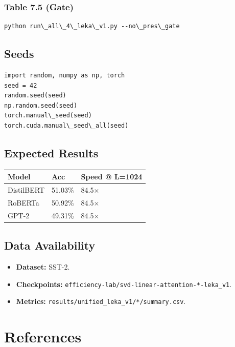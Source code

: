 \subsubsection{Table 7.5 (Gate)}
\begin{lstlisting}
python run\_all\_4\_leka\_v1.py --no\_pres\_gate
\end{lstlisting}

\subsection{Seeds}

\begin{lstlisting}
import random, numpy as np, torch
seed = 42
random.seed(seed)
np.random.seed(seed)
torch.manual\_seed(seed)
torch.cuda.manual\_seed\_all(seed)
\end{lstlisting}

\subsection{Expected Results}

\begin{table}[H]
\centering
\small
\begin{tabular}{lll}
\toprule
\textbf{Model} & \textbf{Acc} & \textbf{Speed @ L=1024} \\
\midrule
DistilBERT & 51.03\% & 84.5$\times$ \\
RoBERTa & 50.92\% & 84.5$\times$ \\
GPT-2 & 49.31\% & 84.5$\times$ \\
\bottomrule
\end{tabular}
\end{table}

\subsection{Data Availability}

\begin{itemize}
\item \textbf{Dataset:} SST-2.
\item \textbf{Checkpoints:} \texttt{efficiency-lab/svd-linear-attention-*-leka\_v1}.
\item \textbf{Metrics:} \texttt{results/unified\_leka\_v1/*/summary.csv}.

\end{itemize}


\section{References}

